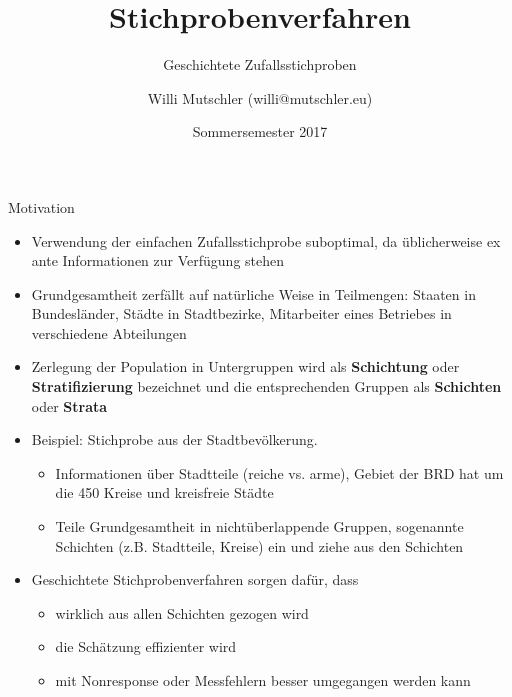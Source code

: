 \documentclass[9pt]{beamer}
\title{Stichprobenverfahren}
\subtitle{Geschichtete Zufallsstichproben}
\date[SS2017]{Sommersemester 2017}
\author{Willi Mutschler (willi@mutschler.eu)}
\begin{document}
\maketitle

\begin{frame}{Motivation}
\begin{itemize}
	\item Verwendung der einfachen Zufallsstichprobe suboptimal, da üblicherweise ex ante Informationen zur Verfügung stehen
	\item Grundgesamtheit zerfällt auf natürliche Weise in Teilmengen: Staaten in Bundesländer, Städte in Stadtbezirke, Mitarbeiter eines Betriebes in verschiedene Abteilungen
	\item Zerlegung der Population in Untergruppen wird als \textbf{Schichtung} oder \textbf{Stratifizierung} bezeichnet und die entsprechenden Gruppen als \textbf{Schichten} oder \textbf{Strata}
	\item Beispiel: Stichprobe aus der Stadtbevölkerung. 
	\begin{itemize}
		\item Informationen über Stadtteile (reiche vs. arme), Gebiet der BRD hat um die 450 Kreise und kreisfreie Städte
		\item Teile Grundgesamtheit in nichtüberlappende Gruppen, sogenannte Schichten (z.B. Stadtteile, Kreise) ein und ziehe aus den Schichten
	\end{itemize}
	\item Geschichtete Stichprobenverfahren sorgen dafür, dass
	\begin{itemize}
		\item wirklich aus allen Schichten gezogen wird
		\item die Schätzung effizienter wird
		\item mit Nonresponse oder Messfehlern besser umgegangen werden kann
	\end{itemize}

\end{itemize}
\end{frame}
\end{document}
